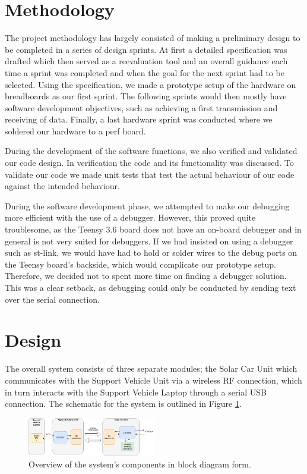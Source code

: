 \documentclass[conference]{IEEEtran}
\begin{document}
\section{Methodology}
The project methodology has largely consisted of making a preliminary design to be completed in a series of design sprints. At first a detailed specification was drafted which then served as a reevaluation tool and an overall guidance each time a sprint was completed and when the goal for the next sprint had to be selected. Using the specification, we made a prototype setup of the hardware on breadboards as our first sprint. The following sprints would then mostly have software development objectives, such as achieving a first transmission and receiving of data. Finally, a last hardware sprint was conducted where we soldered our hardware to a perf board.

During the development of the software functions, we also verified and validated our code design. In verification the code and its functionality was discussed. To validate our code we made unit tests that test the actual behaviour of our code against the intended behaviour.

During the software development phase, we attempted to make our debugging more efficient with the use of a debugger. However, this proved quite troublesome, as the Teensy 3.6 board does not have an on-board debugger and in general is not very suited for debuggers. If we had insisted on using a debugger such as st-link, we would have had to hold or solder wires to the debug ports on the Teensy board's backside, which would complicate our prototype setup. Therefore, we decided not to spent more time on finding a debugger solution. This was a clear setback, as debugging could only be conducted by sending text over the serial connection.

\section{Design}
The overall system consists of three separate modules; the Solar Car Unit which communicates with the Support Vehicle Unit via a wireless RF connection, which in turn interacts with the Support Vehicle Laptop through a serial USB connection. The schematic for the system is outlined in Figure \ref{fig:schematic}. 
\begin{figure}[H]
    \centering
    \includegraphics[width=0.5\textwidth]{documentation/images/schematic.png}
    \caption{Overview of the system's components in block diagram form.}
    \label{fig:schematic}
\end{figure}
% 
\end{document}
